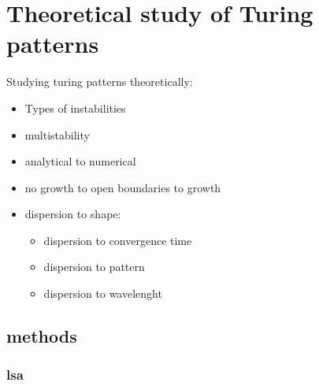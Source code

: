 \chapter{Theoretical study of Turing patterns }
Studying turing patterns theoretically:
\begin{itemize}
\item Types of instabilities
\item multistability
\item analytical to numerical %
\item no growth to open boundaries to growth
\item dispersion to shape:
    \begin{itemize}

    \item dispersion to convergence time
    \item dispersion to pattern
    \item dispersion to wavelenght
     \end{itemize}

\end{itemize}
\section{methods}
\subsection{lsa}

